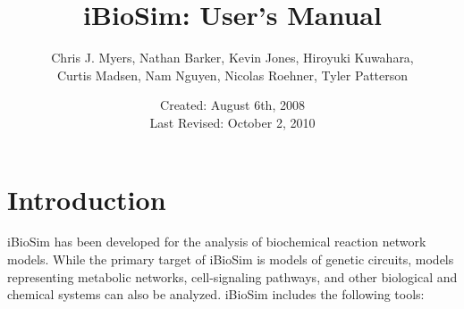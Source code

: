 \documentclass[titlepage,11pt]{article}
\title{iBioSim: User's Manual}
\author{Chris J. Myers, Nathan Barker, Kevin Jones, Hiroyuki Kuwahara,\\ Curtis
  Madsen, Nam Nguyen, Nicolas Roehner, Tyler Patterson}
\date{Created: August 6th, 2008\\
  Last Revised: October 2, 2010
}
\begin{document}
\maketitle

  
\tableofcontents

\clearpage
  

\section{Introduction}

\noindent
iBioSim has been developed for the analysis of biochemical
reaction network models.  While the primary target of iBioSim is
models of genetic circuits, models representing metabolic
networks, cell-signaling pathways, and other biological and
chemical systems can also be analyzed.  iBioSim includes the
following tools: 
\end{document}
